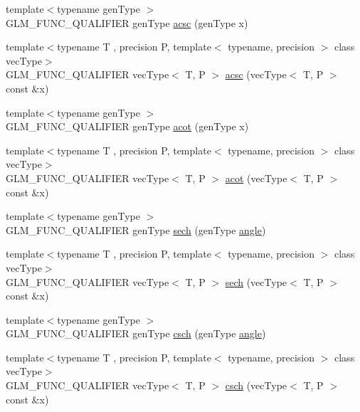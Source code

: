 \begin{DoxyCompactItemize}
\item 
{\footnotesize template$<$typename gen\+Type $>$ }\\G\+L\+M\+\_\+\+F\+U\+N\+C\+\_\+\+Q\+U\+A\+L\+I\+F\+I\+E\+R gen\+Type \hyperlink{namespaceglm_a321f32c7c632a6aa72f038269b763f64}{acsc} (gen\+Type x)
\item 
{\footnotesize template$<$typename T , precision P, template$<$ typename, precision $>$ class vec\+Type$>$ }\\G\+L\+M\+\_\+\+F\+U\+N\+C\+\_\+\+Q\+U\+A\+L\+I\+F\+I\+E\+R vec\+Type$<$ T, P $>$ \hyperlink{namespaceglm_a2e31d118da987ebe04ad6ca3c366b8d8}{acsc} (vec\+Type$<$ T, P $>$ const \&x)
\item 
{\footnotesize template$<$typename gen\+Type $>$ }\\G\+L\+M\+\_\+\+F\+U\+N\+C\+\_\+\+Q\+U\+A\+L\+I\+F\+I\+E\+R gen\+Type \hyperlink{namespaceglm_add36fe1afa6b5889b971ebc569f1579d}{acot} (gen\+Type x)
\item 
{\footnotesize template$<$typename T , precision P, template$<$ typename, precision $>$ class vec\+Type$>$ }\\G\+L\+M\+\_\+\+F\+U\+N\+C\+\_\+\+Q\+U\+A\+L\+I\+F\+I\+E\+R vec\+Type$<$ T, P $>$ \hyperlink{namespaceglm_a83b17146fd12b7822b1a6ef98790a8da}{acot} (vec\+Type$<$ T, P $>$ const \&x)
\item 
{\footnotesize template$<$typename gen\+Type $>$ }\\G\+L\+M\+\_\+\+F\+U\+N\+C\+\_\+\+Q\+U\+A\+L\+I\+F\+I\+E\+R gen\+Type \hyperlink{namespaceglm_a624f38daef5fc0ac5dd3b0ebf3d5d0df}{sech} (gen\+Type \hyperlink{group__gtc__quaternion_gad4a4448baedb198b2b1e7880d2544dc9}{angle})
\item 
{\footnotesize template$<$typename T , precision P, template$<$ typename, precision $>$ class vec\+Type$>$ }\\G\+L\+M\+\_\+\+F\+U\+N\+C\+\_\+\+Q\+U\+A\+L\+I\+F\+I\+E\+R vec\+Type$<$ T, P $>$ \hyperlink{namespaceglm_ad9b404c885d4fb0f7d227186b2444a10}{sech} (vec\+Type$<$ T, P $>$ const \&x)
\item 
{\footnotesize template$<$typename gen\+Type $>$ }\\G\+L\+M\+\_\+\+F\+U\+N\+C\+\_\+\+Q\+U\+A\+L\+I\+F\+I\+E\+R gen\+Type \hyperlink{namespaceglm_abf6760fd12e46b2805237ff556d80d60}{csch} (gen\+Type \hyperlink{group__gtc__quaternion_gad4a4448baedb198b2b1e7880d2544dc9}{angle})
\item 
{\footnotesize template$<$typename T , precision P, template$<$ typename, precision $>$ class vec\+Type$>$ }\\G\+L\+M\+\_\+\+F\+U\+N\+C\+\_\+\+Q\+U\+A\+L\+I\+F\+I\+E\+R vec\+Type$<$ T, P $>$ \hyperlink{namespaceglm_aefec80643f2f2bde7247fa8d54ccd351}{csch} (vec\+Type$<$ T, P $>$ const \&x)

\end{DoxyCompactItemize}
